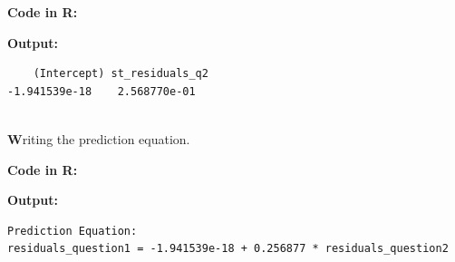 \documentclass[12pt,letterpaper]{article}
\begin{document}
\begin{enumerate}
		\noindent \textbf{Code in R:}
		  
		\vspace{.25cm}
		
		\noindent \textbf{Output: }
		\begin{verbatim}
    (Intercept) st_residuals_q2   
-1.941539e-18    2.568770e-01 		
			
		\end{verbatim}  
		\vspace{.25cm}
		
		\noindent \textbf Writing the prediction equation. 
		\vspace{0.5cm}

		\noindent \textbf{Code in R:}
		  
		\vspace{.25cm}

		\noindent \textbf{Output: }
		\begin{verbatim}
Prediction Equation: 
residuals_question1 = -1.941539e-18 + 0.256877 * residuals_question2
		\end{verbatim}  
		\vspace{1 cm}
		\end{enumerate}
	
	\newpage	
\end{document}
